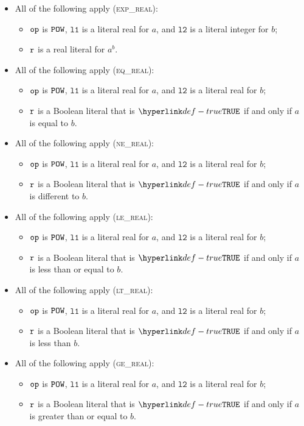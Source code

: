 \documentclass{book}
\newcommand\vlone[0]{\texttt{l1}}
\newcommand\vltwo[0]{\texttt{l2}}
\begin{document}
\begin{itemize}
  \item All of the following apply (\textsc{exp\_real}):
  \begin{itemize}
    \item $\texttt{op}$ is $\texttt{POW}$, $\vlone$ is a literal real for $a$, and $\vltwo$ is a literal integer for $b$;
    \item $\texttt{r}$ is a real literal for $a^b$.
  \end{itemize}

  \item All of the following apply (\textsc{eq\_real}):
  \begin{itemize}
    \item $\texttt{op}$ is $\texttt{POW}$, $\vlone$ is a literal real for $a$, and $\vltwo$ is a literal real for $b$;
    \item $\texttt{r}$ is a Boolean literal that is $\True$ if and only if $a$ is equal to $b$.
  \end{itemize}

  \item All of the following apply (\textsc{ne\_real}):
  \begin{itemize}
    \item $\texttt{op}$ is $\texttt{POW}$, $\vlone$ is a literal real for $a$, and $\vltwo$ is a literal real for $b$;
    \item $\texttt{r}$ is a Boolean literal that is $\True$ if and only if $a$ is different to $b$.
  \end{itemize}

  \item All of the following apply (\textsc{le\_real}):
  \begin{itemize}
    \item $\texttt{op}$ is $\texttt{POW}$, $\vlone$ is a literal real for $a$, and $\vltwo$ is a literal real for $b$;
    \item $\texttt{r}$ is a Boolean literal that is $\True$ if and only if $a$ is less than or equal to $b$.
  \end{itemize}

  \item All of the following apply (\textsc{lt\_real}):
  \begin{itemize}
    \item $\texttt{op}$ is $\texttt{POW}$, $\vlone$ is a literal real for $a$, and $\vltwo$ is a literal real for $b$;
    \item $\texttt{r}$ is a Boolean literal that is $\True$ if and only if $a$ is less than $b$.
  \end{itemize}

  \item All of the following apply (\textsc{ge\_real}):
  \begin{itemize}
    \item $\texttt{op}$ is $\texttt{POW}$, $\vlone$ is a literal real for $a$, and $\vltwo$ is a literal real for $b$;
    \item $\texttt{r}$ is a Boolean literal that is $\True$ if and only if $a$ is greater than or equal to $b$.
  \end{itemize}


\end{itemize}
\end{document}
